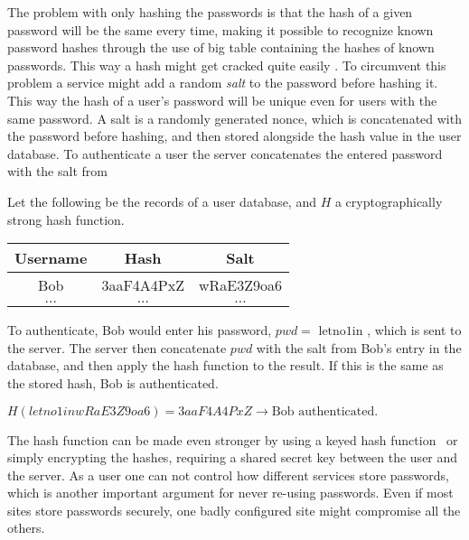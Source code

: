 \par The problem with only hashing the passwords is that the hash of a given password will be the same every time, making it possible to recognize known password hashes through the use of big table containing the hashes of known passwords. This way a hash might get cracked quite easily . To circumvent this problem a service might add a random \emph{salt} to the password before hashing it. This way the hash of a user's password will be unique even for users with the same password. A salt is a randomly generated nonce, which is concatenated with the password before hashing, and then stored alongside the hash value in the user database. To authenticate a user the server concatenates the entered password with the salt from 

\begin{example}
Let the following be the records of a user database, and $H$ a cryptographically strong hash function.
    \begin{table}[ht!]
        \centering
    \begin{tabular}{|c|c|c|}
        \hline
        Username & Hash & Salt \\
        \hline
        Bob & 3aaF4A4PxZ & wRaE3Z9oa6 \\
        \hline
        $\dots$ & $\dots$ & $\dots$ \\
        \hline
    \end{tabular}
    \end{table}
\par To authenticate, Bob would enter his password, $pwd=\text{ letno1in }$, which is sent to the server. The server then concatenate $pwd$ with the salt from Bob's entry in the database, and then apply the hash function to the result. If this is the same as the stored hash, Bob is authenticated.\\
 \centerline{   $H(letno1inwRaE3Z9oa6) = 3aaF4A4PxZ \rightarrow \text{Bob authenticated}.$  }

\end{example}



The hash function can be made even stronger by using a keyed hash function~\cite{keyedhash} or simply encrypting the hashes, requiring a shared secret key between the user and the server. As a user one can not control how different services store passwords, which is another important argument for never re-using passwords. Even if most sites store passwords securely, one badly configured site might compromise all the others. 



